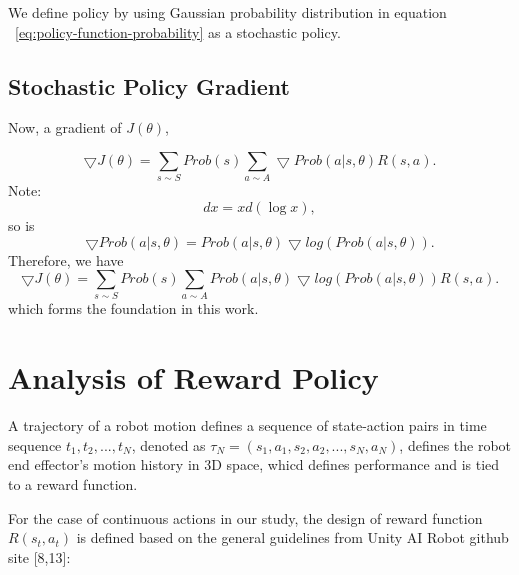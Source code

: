 \documentclass[conference]{IEEEtran}
\begin{document}
We define policy by using Gaussian probability distribution
in equation ~\ref{eq:policy-function-probability}
as a stochastic policy. 

\subsection{Stochastic Policy Gradient}

Now, a gradient of $J({\theta})$, 

\begin{equation}
\bigtriangledown J({\theta})
= 
\displaystyle
\sum_{s \sim S} Prob(s) \sum_{a \sim A}
\bigtriangledown Prob(a|s, \theta) R (s, a) .
\label{eq:policy-gradient}
\end{equation}
Note: 
\begin{equation}
dx = x d(\log x) , 
\end{equation}
so is 
\begin{equation}
\bigtriangledown Prob(a|s, \theta) =
Prob(a|s, \theta) \bigtriangledown log (Prob(a|s, \theta)). 
\end{equation}
Therefore, we have 
\begin{equation}
\bigtriangledown J({\theta})
= 
\displaystyle
\sum_{s \sim S} Prob(s) \sum_{a \sim A}
Prob(a|s, \theta) \bigtriangledown log (Prob(a|s, \theta)) R (s, a) .
\label{eq:policy-gradient-log}
\end{equation}
which forms the foundation in this work. 

\section{Analysis of Reward Policy}
A trajectory of a robot motion defines 
a sequence of state-action pairs in time sequence 
$t_1, t_2, ..., t_N$, denoted as 
${\tau}_N = (s_1,a_1,s_2,a_2,...,s_N,a_N)$, defines 
the robot end effector's motion history in 3D space, 
whicd defines performance and is tied to a 
reward function.  
  
For the case of continuous actions in our study, 
the design of reward function $R(s_t, a_t)$ is defined 
based on the general guidelines
from Unity AI Robot github 
site [8,13]: 
 
\end{document}
